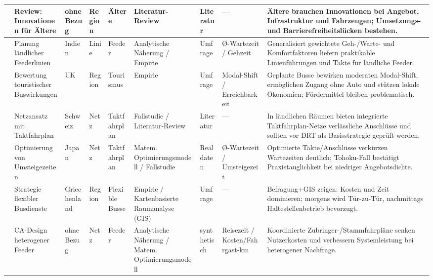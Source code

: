 \begin{landscape}
\begin{table}[p]
{\begin{tabular}{
          L{2.0cm}:
          L{2.5cm}:
          L{2.0cm}:
          L{2.0cm}:
          L{2.5cm}:
          L{2.3cm}:
          L{1.8cm}:
          L{2.6cm}:
          L{7.4cm}:
        }
            \textcite{cirella_transport_2019} & Review: Innovationen für Ältere & ohne Bezug & Region & Ältere & Literatur-Review & Literatur & — & Ältere brauchen Innovationen bei Angebot, Infrastruktur und Fahrzeugen; Umsetzungs- und Barrierefreiheitslücken bestehen. \\ \hline
            \textcite{das_planning_2012} & Planung ländlicher Feederlinien & Indien & Linie & Feeder & Analytische Näherung / Empirie & Umfrage & Ø-Wartezeit / Gehzeit & Generalisiert gewichtete Geh-/Warte- und Komfortfaktoren liefern praktikable Linienführungen und Takte für ländliche Feeder. \\ \hline
            \textcite{guiver_buses_2007} & Bewertung touristischer Buswirkungen & UK & Region & Tourismus & Empirie & Umfrage & Modal-Shift / Erreichbarkeit & Geplante Busse bewirken moderaten Modal-Shift, ermöglichen Zugang ohne Auto und stützen lokale Ökonomien; Fördermittel bleiben problematisch. \\ \hline
            \textcite{petersen_watching_2016} & Netzansatz mit Taktfahrplan & Schweiz & Netz & Taktfahrplan & Fallstudie / Literatur-Review & Literatur & — & In ländlichen Räumen bieten integrierte Taktfahrplan-Netze verlässliche Anschlüsse und sollten vor DRT als Basisstrategie geprüft werden. \\ \hline
            \textcite{takamatsu_bus_2020} & Optimierung von Umsteigezeiten & Japan & Netz & Taktfahrplan & Matem. Optimierungsmodell / Fallstudie & Realdaten & Ø-Wartezeit / Umsteigezeit & Optimierte Takte/Anschlüsse verkürzen Wartezeiten deutlich; Tohoku-Fall bestätigt Praxistauglichkeit bei niedriger Angebotsdichte. \\ \hline
            \textcite{tsigdinos_route_2024} & Strategie flexibler Busdienste & Griechenland & Region & Flexible Busse & Empirie / Kartenbasierte Raumanalyse (GIS) & Umfrage & — & Befragung+GIS zeigen: Kosten und Zeit dominieren; morgens wird Tür-zu-Tür, nachmittags Haltestellenbetrieb bevorzugt. \\ \hline
            \textcite{zhen_feeder_2024} & CA-Design heterogener Feeder & ohne Bezug & Netz & Feeder & Analytische Näherung / Matem. Optimierungsmodell & synthetisch & Reisezeit / Kosten/Fahrgast-km & Koordinierte Zubringer-/Stammfahrpläne senken Nutzerkosten und verbessern Systemleistung bei heterogener Nachfrage. \\ \hline
        \end{tabular}
        }%
    \end{table}
\end{landscape}

